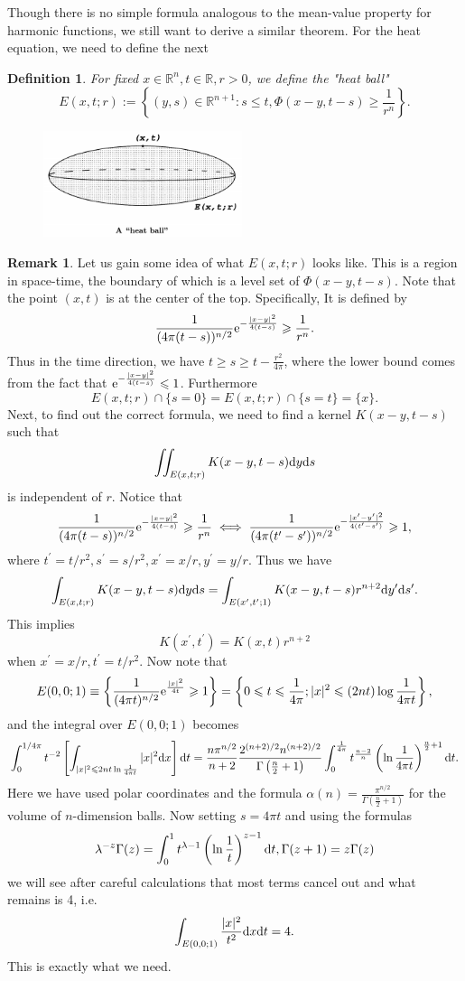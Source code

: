 \documentclass[hyperref,UTF8,12pt]{article}
\numberwithin{equation}{subsection}
\theoremstyle{plain}
\newtheorem{definition}{Definition}
\theoremstyle{definition}
\newtheorem{remark}{Remark}
\numberwithin{theorem}{section}
\numberwithin{lemma}{section}
\numberwithin{proposition}{section}
\numberwithin{remark}{section}
\numberwithin{corollary}{section}
\numberwithin{definition}{section}
\numberwithin{problem}{section}
\numberwithin{example}{section}
\def\e{\textup{e}}
\def\dif{\textup{d}}
\newcommand{\mr}{\mathbb{R}}
\renewcommand{\leq}{\leqslant}
\renewcommand{\geq}{\geqslant}
\begin{document}
Though there is no simple formula analogous to the mean-value property for harmonic functions, we still want to derive a similar theorem. For the heat equation, we need to define the next
\begin{definition}
For fixed $x\in\mr^n,t\in\mr,r>0$, we define the "heat ball"\[E(x,t;r):=
\left\{(y,s)\in\mr^{n+1}:s\leq t,\Phi(x-y,t-s)\geq\frac{1}{r^n}\right\}.\]
\end{definition}
\begin{figure}[h]
\centering
\includegraphics[width=0.52\textwidth]{heat ball.png}
\end{figure}
\begin{remark}
Let us gain some idea of what $E(x,t;r)$ looks like. This is a region in space-time, the boundary of which is a level set of $\Phi(x-y,t-s)$. Note that the point $(x,t)$ is at the center of the top.
Specifically, It is defined by\[\frac{1}{(4\pi(t-s))^{n/2}}\e^{-\frac{|x-y|^2}{4(t-s)}}\geq \frac{1}{r^n}.\]Thus in the time direction, we have $t\geq s\geq t-\frac{r^2}{4\pi}$, where the lower bound comes from the fact that $\e^{-\frac{|x-y|^2}{4(t-s)}}\leq1$. Furthermore
\[E(x,t;r)\cap\{s=0\}=E(x,t;r)\cap\{s=t\}=\{x\}.\]Next, to find out the correct formula, we need to find a kernel $K(x-y,t-s)$ such that\[\iint_{E(x,t;r)}K(x-y,t-s)\dif y\dif s\]is independent of $r$. Notice that
\[\frac{1}{(4\pi(t-s))^{n/2}}\e^{-\frac{|x-y|^2}{4(t-s)}}\geq\frac{1}{r^n} \iff\frac{1}{(4\pi(t^\prime-s^\prime))^{n/2}}\e^{-\frac{|x^\prime-y^\prime|^2}{4(t^\prime-s^\prime)}}\geq1,\]where $t^\prime=t/r^2,s^\prime=s/r^2,x^\prime=x/r,y^\prime=y/r$. Thus we have
\[\int_{E(x,t;r)}K(x-y,t-s)\dif y\dif s=\int_{E(x^\prime,t^\prime;1)}K(x-y,t-s)r^{n+2}\dif y^\prime\dif s^\prime.\]
This implies\[K(x^\prime,t^\prime)=K(x,t)r^{n+2}\]when $x^\prime=x/r,t^\prime=t/r^2$. Now note that\[E(0,0;1)\equiv\left\{\frac{1}{(4\pi t)^{n/2}}\e^{\frac{|x|^2}{4t}}\geq 1\right\}=\left\{0\leq t\leq\frac{1}{4\pi};|x|^2\leq(2nt)\log\frac{1}{4\pi t}\right\},\]and the integral over $E(0,0;1)$ becomes\[\int_0^{1/4\pi}t^{-2} \left[\int_{|x|^2\leq2nt\ln\frac{1}{4\pi t}}|x|^2\dif x\right]\dif t=\frac{n\pi^{n/2}}{n+2} \frac{2^{(n+2)/2}n^{(n+2)/2}}{\Gamma\left(\frac{n}{2}+1\right)}\int_0^{\frac{1}{4\pi}}t^{\frac{n-2}{n}}\left(\ln\frac{1}{4\pi t}\right)^{\frac{n}{2}+1}\dif t.\]Here we have used polar coordinates and the formula $\alpha(n)=\frac{\pi^{n/2}}{\Gamma\left(\frac{n}{2}+1\right)}$ for the volume of $n$-dimension balls. Now setting $s=4\pi t$ and using the formulas\[\lambda^{-z}\Gamma(z)
=\int_0^1t^{\lambda-1}\left(\ln\frac{1}{t}\right)^{z-1}\dif t,\Gamma(z+1)=z\Gamma(z)\] we will see after careful calculations that most terms cancel out and what remains is 4, i.e.
\[\int_{E(0,0 ;1)}\frac{|x|^2}{t^2}\dif x\dif t=4.\]This is exactly what we need.
\end{remark}
\end{document}
